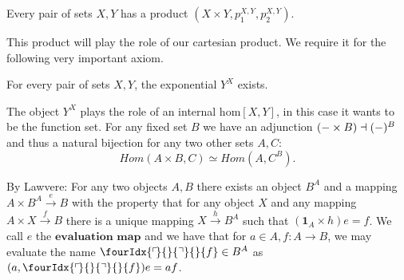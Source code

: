 \begin{axiom}
Every pair of sets $X, Y$ has a product $(X \times Y, p_1^{X,Y}, p_2^{X,Y})$.
\end{axiom}

\begin{remark}
This product will play the role of our cartesian product. We require it for the following very important axiom.
\end{remark}

\begin{axiom}
For every pair of sets $X, Y$, the exponential $Y^X$ exists.
\end{axiom}

\begin{remark}[$\dagger$]
The object $Y^X$ plays the role of an internal hom$[X,Y]$, in this case it wants to be the function set. For any fixed set $B$ we have an adjunction $(\-- \times B) \dashv (\--)^B$ and thus a natural bijection for any two other sets $A,C$:
\begin{equation*}
Hom(A \times B, C) \simeq Hom(A, C^B).
\end{equation*}

By Lawvere: For any two objects $A, B$ there exists an object $B^A$ and a mapping $A \times B^A \xrightarrow{e} B$ with the property that for any object $X$ and any mapping $A \times X\xrightarrow{f} B$ there is a unique mapping $X \xrightarrow{h} B^A$ such that $(\mathbf{1}_A \times h)e = f$. We call $e$ the $\textbf{evaluation map}$ and we have that for $a \in A, f:A\longrightarrow B$, we may evaluate the name $\fourIdx{\ulcorner\mkern-3mu}{}{\urcorner}{}{f} \in B^A$ as $(a,\fourIdx{\ulcorner\mkern-3mu}{}{\urcorner}{}{f})e = af$.

\end{remark}

